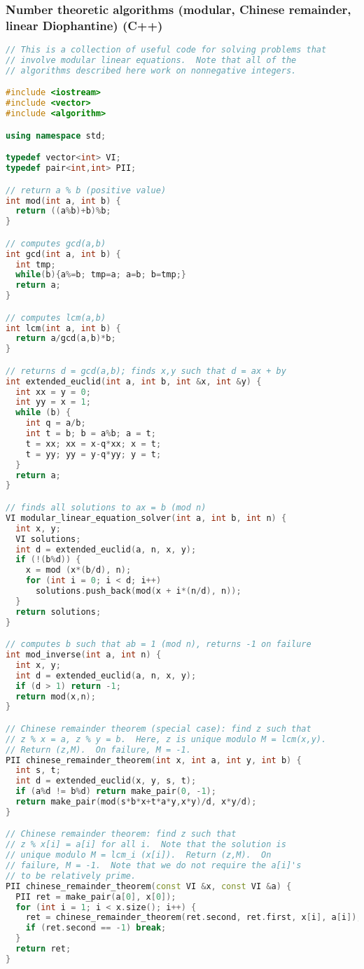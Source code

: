 \subsubsection{Number theoretic algorithms (modular, Chinese remainder, linear Diophantine) (C++)}
\begin{lstlisting}[language=C++]
// This is a collection of useful code for solving problems that
// involve modular linear equations.  Note that all of the
// algorithms described here work on nonnegative integers.

#include <iostream>
#include <vector>
#include <algorithm>

using namespace std;

typedef vector<int> VI;
typedef pair<int,int> PII;

// return a % b (positive value)
int mod(int a, int b) {
  return ((a%b)+b)%b;
}

// computes gcd(a,b)
int gcd(int a, int b) {
  int tmp;
  while(b){a%=b; tmp=a; a=b; b=tmp;}
  return a;
}

// computes lcm(a,b)
int lcm(int a, int b) {
  return a/gcd(a,b)*b;
}

// returns d = gcd(a,b); finds x,y such that d = ax + by
int extended_euclid(int a, int b, int &x, int &y) {  
  int xx = y = 0;
  int yy = x = 1;
  while (b) {
    int q = a/b;
    int t = b; b = a%b; a = t;
    t = xx; xx = x-q*xx; x = t;
    t = yy; yy = y-q*yy; y = t;
  }
  return a;
}

// finds all solutions to ax = b (mod n)
VI modular_linear_equation_solver(int a, int b, int n) {
  int x, y;
  VI solutions;
  int d = extended_euclid(a, n, x, y);
  if (!(b%d)) {
    x = mod (x*(b/d), n);
    for (int i = 0; i < d; i++)
      solutions.push_back(mod(x + i*(n/d), n));
  }
  return solutions;
}

// computes b such that ab = 1 (mod n), returns -1 on failure
int mod_inverse(int a, int n) {
  int x, y;
  int d = extended_euclid(a, n, x, y);
  if (d > 1) return -1;
  return mod(x,n);
}

// Chinese remainder theorem (special case): find z such that
// z % x = a, z % y = b.  Here, z is unique modulo M = lcm(x,y).
// Return (z,M).  On failure, M = -1.
PII chinese_remainder_theorem(int x, int a, int y, int b) {
  int s, t;
  int d = extended_euclid(x, y, s, t);
  if (a%d != b%d) return make_pair(0, -1);
  return make_pair(mod(s*b*x+t*a*y,x*y)/d, x*y/d);
}

// Chinese remainder theorem: find z such that
// z % x[i] = a[i] for all i.  Note that the solution is
// unique modulo M = lcm_i (x[i]).  Return (z,M).  On 
// failure, M = -1.  Note that we do not require the a[i]'s
// to be relatively prime.
PII chinese_remainder_theorem(const VI &x, const VI &a) {
  PII ret = make_pair(a[0], x[0]);
  for (int i = 1; i < x.size(); i++) {
    ret = chinese_remainder_theorem(ret.second, ret.first, x[i], a[i]);
    if (ret.second == -1) break;
  }
  return ret;
}


\end{lstlisting}
